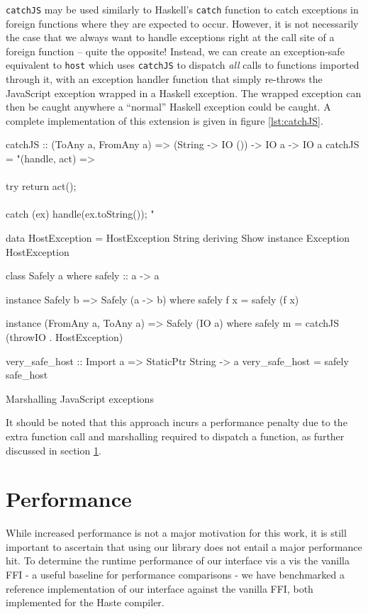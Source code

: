 \documentclass[preprint]{sigplanconf}
\begin{document}
\lstinline!catchJS! may be used similarly to Haskell's \lstinline!catch!
function to catch exceptions in foreign functions where they are expected to
occur.
However, it is not necessarily the case that we always want to handle
exceptions right at the call site of a foreign function -- quite the opposite!
Instead, we can create an exception-safe equivalent to \lstinline!host! which
uses \lstinline!catchJS! to dispatch \emph{all} calls to functions imported
through it, with an exception handler function that simply re-throws the
JavaScript exception wrapped in a Haskell exception. The wrapped exception
can then be caught anywhere a ``normal'' Haskell exception could be caught.
A complete implementation of this extension is given in
figure \ref{lst:catchJS}.

\begin{listingfloat}
\begin{code}
catchJS :: (ToAny a, FromAny a)
        => (String -> IO ())
        -> IO a -> IO a
catchJS = "(handle, act) =>\\
  \\{ try        { return act(); }\\
  \\  catch (ex) { handle(ex.toString()); }}"

data HostException = HostException String
  deriving Show
instance Exception HostException
  
class Safely a where
  safely :: a -> a

instance Safely b => Safely (a -> b) where
  safely f x = safely (f x)

instance (FromAny a, ToAny a) => Safely (IO a) where
  safely m = catchJS (throwIO . HostException)

very_safe_host :: Import a => StaticPtr String -> a
very_safe_host = safely safe_host
\end{code}
\caption{Marshalling JavaScript exceptions}
\label{lst:catchJS}
\end{listingfloat}

It should be noted that this approach incurs a performance penalty due to the
extra function call and marshalling required to dispatch a function, as further
discussed in section \ref{sec:performance}.


\section{Performance}
\label{sec:performance}
While increased performance is not a major motivation for this work, it is
still important to ascertain that using our library does not entail a major
performance hit. To determine the runtime performance of our interface
vis a vis the vanilla FFI - a useful baseline for performance comparisons - we
have benchmarked a reference implementation of our interface against the
vanilla FFI, both implemented for the Haste compiler.
\end{document}
